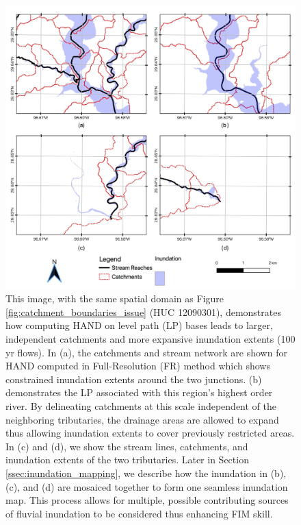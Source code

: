 \documentclass[draft]{dependencies/agujournal2019}
\begin{document}
\begin{figure}[H]
\centering
\includegraphics[scale=0.70]{figures/gms_methods_2.jpg}
\caption{This image, with the same spatial domain as Figure \ref{fig:catchment_boundaries_issue} (HUC 12090301), demonstrates how computing HAND on level path (LP) bases leads to larger, independent catchments and more expansive inundation extents (100 yr flows).
In (a), the catchments and stream network are shown for HAND computed in Full-Resolution (FR) method which shows constrained inundation extents around the two junctions.
(b) demonstrates the LP associated with this region's highest order river.
By delineating catchments at this scale independent of the neighboring tributaries, the drainage areas are allowed to expand thus allowing inundation extents to cover previously restricted areas.
In (c) and (d), we show the stream lines, catchments, and inundation extents of the two tributaries.
Later in Section \ref{ssec:inundation_mapping}, we describe how the inundation in (b), (c), and (d) are mosaiced together to form one seamless inundation map.
This process allows for multiple, possible contributing sources of fluvial inundation to be considered thus enhancing FIM skill.
}
\label{fig:gms_methods_2}
\end{figure}
%
\end{document}
